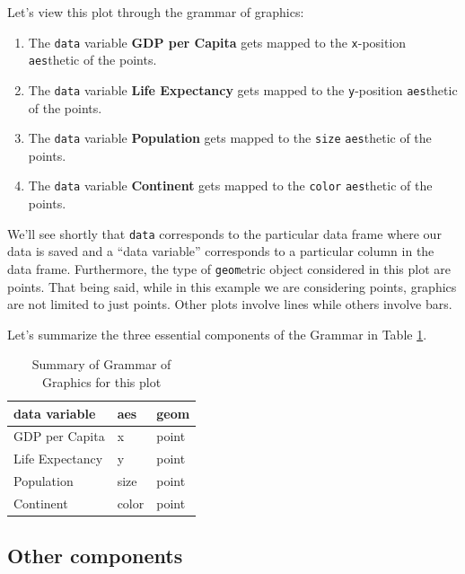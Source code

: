 \documentclass[12pt, krantz2,]{krantz}
\providecommand{\tightlist}{%
  \setlength{\itemsep}{0pt}\setlength{\parskip}{0pt}}
\begin{document}
Let's view this plot through the grammar of graphics:

\begin{enumerate}
\def\labelenumi{\arabic{enumi}.}
\tightlist
\item
  The \texttt{data} variable \textbf{GDP per Capita} gets mapped to the \texttt{x}-position \texttt{aes}thetic of the points.
\item
  The \texttt{data} variable \textbf{Life Expectancy} gets mapped to the \texttt{y}-position \texttt{aes}thetic of the points.
\item
  The \texttt{data} variable \textbf{Population} gets mapped to the \texttt{size} \texttt{aes}thetic of the points.
\item
  The \texttt{data} variable \textbf{Continent} gets mapped to the \texttt{color} \texttt{aes}thetic of the points.
\end{enumerate}

We'll see shortly that \texttt{data} corresponds to the particular data frame where our data is saved and a ``data variable'' corresponds to a particular column in the data frame. Furthermore, the type of \texttt{geom}etric object considered in this plot are points. That being said, while in this example we are considering points, graphics are not limited to just points. Other plots involve lines while others involve bars.

Let's summarize the three essential components of the Grammar in Table \ref{tab:summary-table-gapminder}.

\begin{table}[H]

\caption{\label{tab:summary-table-gapminder}Summary of Grammar of Graphics for this plot}
\centering
\fontsize{10}{12}\selectfont
\begin{tabular}{lll}
\toprule
data variable & aes & geom\\
\midrule
GDP per Capita & x & point\\
Life Expectancy & y & point\\
Population & size & point\\
Continent & color & point\\
\bottomrule
\end{tabular}
\end{table}

\hypertarget{other-components}{%
\subsection{Other components}\label{other-components}}
\end{document}
